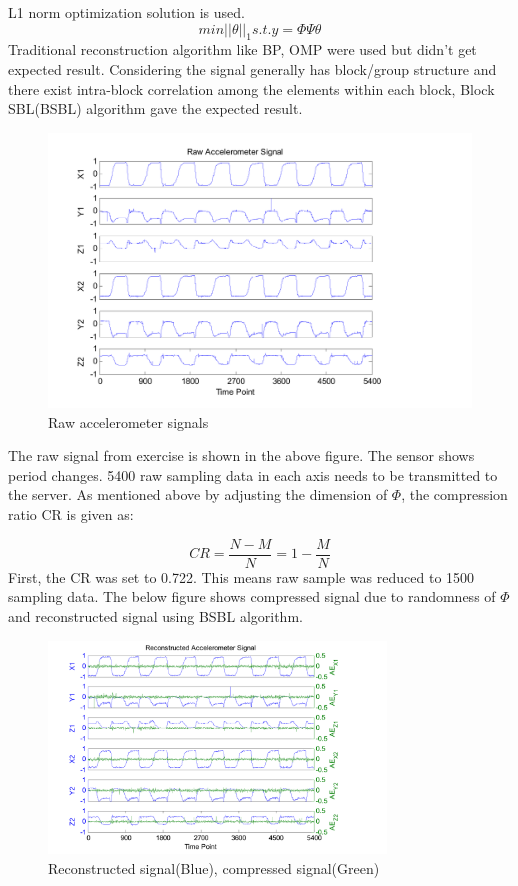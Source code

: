 \documentclass{article}
\begin{document}
L1 norm optimization solution is used.
$$ min||\theta||_1 s.t. y = \Phi \Psi \theta$$ 
Traditional reconstruction algorithm like BP, OMP were used but didn't get expected result. Considering the signal generally has block/group structure and there exist intra-block correlation among the elements within each block, Block SBL(BSBL) algorithm gave the expected result.
\begin{figure}[ht]
\centering
\includegraphics[width=.8\textwidth]{papers/raw_signals.png}
\caption{Raw accelerometer signals}
\end{figure}
The raw signal from exercise is shown in the above figure. The sensor shows period changes. 5400 raw sampling data in each axis needs to be transmitted to the server.
As mentioned above by adjusting the dimension of $\Phi$, the compression ratio CR is given as:

$$ CR = \frac{N-M}{N} = 1 - \frac{M}{N}$$
First, the CR was set to 0.722. This means raw sample was reduced to 1500 sampling data. The below figure shows compressed signal due to randomness of $\Phi$ and reconstructed signal using BSBL algorithm.

\begin{figure}[ht]
\centering
\includegraphics[width=0.8\textwidth]{papers/result.png}
\caption{Reconstructed signal(Blue), compressed signal(Green)}
\end{figure}
\newpage
\end{document}
